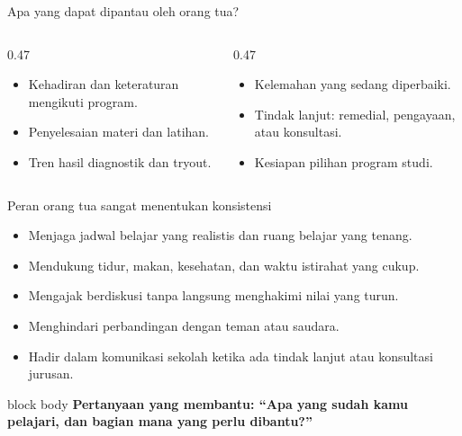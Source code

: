 \begin{frame}{Apa yang dapat dipantau oleh orang tua?}
  \begin{columns}[T,onlytextwidth]
    \begin{column}{0.47\textwidth}
      \begin{itemize}
        \item Kehadiran dan keteraturan mengikuti program.
        \item Penyelesaian materi dan latihan.
        \item Tren hasil diagnostik dan tryout.
      \end{itemize}
    \end{column}
    \begin{column}{0.47\textwidth}
      \begin{itemize}
        \item Kelemahan yang sedang diperbaiki.
        \item Tindak lanjut: remedial, pengayaan, atau konsultasi.
        \item Kesiapan pilihan program studi.
      \end{itemize}
    \end{column}
  \end{columns}
  \vspace{0.34cm}
\end{frame}

\begin{frame}{Peran orang tua sangat menentukan konsistensi}
  {\fontsize{12}{15.2}\selectfont
  \begin{itemize}
    \item Menjaga jadwal belajar yang realistis dan ruang belajar yang tenang.
    \item Mendukung tidur, makan, kesehatan, dan waktu istirahat yang cukup.
    \item Mengajak berdiskusi tanpa langsung menghakimi nilai yang turun.
    \item Menghindari perbandingan dengan teman atau saudara.
    \item Hadir dalam komunikasi sekolah ketika ada tindak lanjut atau konsultasi jurusan.
  \end{itemize}}
  \vspace{0.12cm}
  \begin{beamercolorbox}[rounded=true,sep=0.23cm,wd=\textwidth]{block body}
    \centering\bfseries Pertanyaan yang membantu: ``Apa yang sudah kamu pelajari, dan bagian mana yang perlu dibantu?''
  \end{beamercolorbox}
\end{frame}

